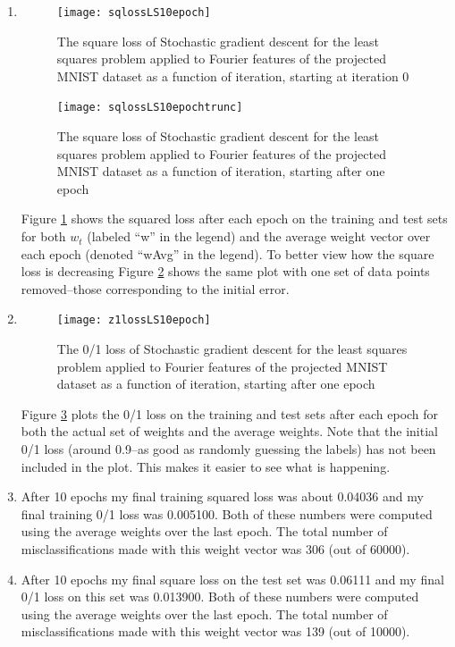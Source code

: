 \documentclass{article}
\begin{document}
\begin{enumerate}
	\item
	\begin{figure}
        \centering
        \texttt{[image: sqlossLS10epoch]}
        \caption{The square loss of Stochastic gradient descent for the least squares problem applied to Fourier features of the projected MNIST dataset as a function of iteration, starting at iteration 0} 
        \label{fig:sqlossLS10epoch}
    \end{figure}
    \begin{figure}
        \centering
        \texttt{[image: sqlossLS10epochtrunc]}
        \caption{The square loss of Stochastic gradient descent for the least squares problem applied to Fourier features of the projected MNIST dataset as a function of iteration, starting after one epoch} 
        \label{fig:sqlossLS10epochtrunc}
    \end{figure}
	Figure \ref{fig:sqlossLS10epoch} shows the squared loss after each epoch on the training and test sets for both $w_t$ (labeled ``w'' in the legend) and the average weight vector over each epoch (denoted ``wAvg'' in the legend). To better view how the square loss is decreasing Figure \ref{fig:sqlossLS10epochtrunc} shows the same plot with one set of data points removed--those corresponding to the initial error.
	\item
    \begin{figure}
        \centering
        \texttt{[image: z1lossLS10epoch]}
        \caption{The 0/1 loss of Stochastic gradient descent for the least squares problem applied to Fourier features of the projected MNIST dataset as a function of iteration, starting after one epoch} 
        \label{fig:z1lossLS10epoch}
    \end{figure}
	Figure \ref{fig:z1lossLS10epoch} plots the 0/1 loss on the training and test sets after each epoch for both the actual set of weights and the average weights. Note that the initial 0/1 loss (around 0.9--as good as randomly guessing the labels) has not been included in the plot. This makes it easier to see what is happening.
	\item After 10 epochs my final training squared loss was about 0.04036 and my final training 0/1 loss was 0.005100. Both of these numbers were computed using the average weights over the last epoch. The total number of misclassifications made with this weight vector was 306 (out of 60000).
	\item After 10 epochs my final square loss on the test set was 0.06111 and my final 0/1 loss on this set was 0.013900. Both of these numbers were computed using the average weights over the last epoch. The total number of misclassifications made with this weight vector was 139 (out of 10000).

\end{enumerate}
\end{document}
